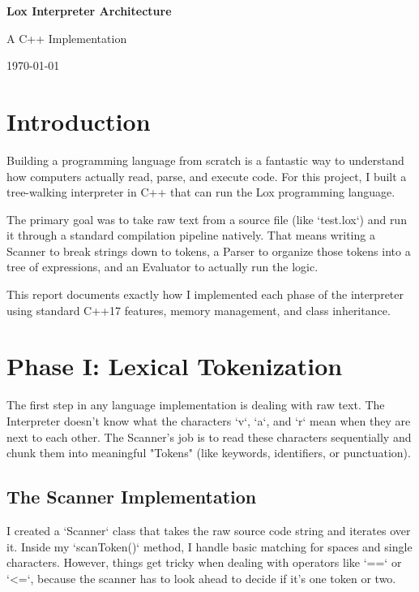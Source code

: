 \documentclass[12pt,a4paper,oneside]{report}
\begin{document}
\begin{titlepage}
    \centering
    \vspace*{2cm}
    {\LARGE\bfseries Lox Interpreter Architecture\par}
    \vspace{0.5cm}
    {\large A C++ Implementation\par}
    \vspace{3cm}
    \vfill
    {\large \today\par}
\end{titlepage}

\tableofcontents
\newpage

\chapter{Introduction}

Building a programming language from scratch is a fantastic way to understand how computers actually read, parse, and execute code. For this project, I built a tree-walking interpreter in C++ that can run the Lox programming language. 

The primary goal was to take raw text from a source file (like `test.lox`) and run it through a standard compilation pipeline natively. That means writing a Scanner to break strings down to tokens, a Parser to organize those tokens into a tree of expressions, and an Evaluator to actually run the logic.

This report documents exactly how I implemented each phase of the interpreter using standard C++17 features, memory management, and class inheritance. 

\chapter{Phase I: Lexical Tokenization}

The first step in any language implementation is dealing with raw text. The Interpreter doesn't know what the characters `v`, `a`, and `r` mean when they are next to each other. The Scanner's job is to read these characters sequentially and chunk them into meaningful "Tokens" (like keywords, identifiers, or punctuation).

\section{The Scanner Implementation}

I created a `Scanner` class that takes the raw source code string and iterates over it. Inside my `scanToken()` method, I handle basic matching for spaces and single characters. However, things get tricky when dealing with operators like `==` or `<=`, because the scanner has to look ahead to decide if it's one token or two.
\end{document}
